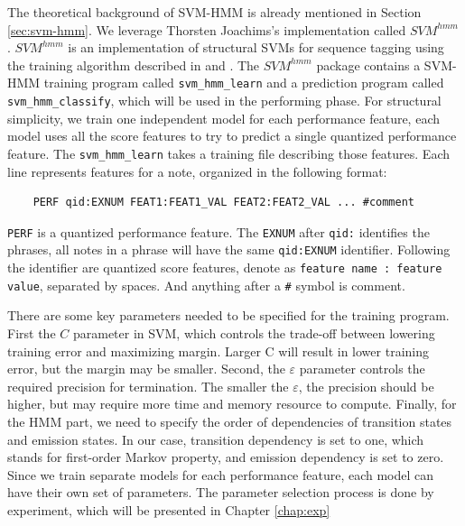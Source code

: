 The theoretical background of SVM-HMM is already mentioned in Section \ref{sec:svm-hmm}. We leverage Thorsten Joachims's implementation called $SVM^{hmm}$ \cite{Joachims2008}. $SVM^{hmm}$ is an implementation of structural SVMs for sequence tagging \cite{svm2003} using the training algorithm described in \cite{svm2005} and \cite{svm2009}. The $SVM^{hmm}$ package contains a SVM-HMM training program called \texttt{svm\_hmm\_learn} and a prediction program called \texttt{svm\_hmm\_classify}, which will be used in the performing phase. For structural simplicity, we train one independent model for each performance feature, each model uses all the score features to try to predict a single quantized performance feature. The \texttt{svm\_hmm\_learn} takes a training file describing those features. Each line represents features for a note, organized in the following format:
\begin{lstlisting}
	PERF qid:EXNUM FEAT1:FEAT1_VAL FEAT2:FEAT2_VAL ... #comment
\end{lstlisting}
\texttt{PERF} is a quantized performance feature. The \texttt{EXNUM} after \texttt{qid:} identifies the phrases, all notes in a phrase will have the same \texttt{qid:EXNUM} identifier. Following the identifier are quantized score features, denote as \texttt{feature name : feature value}, separated by spaces. And anything after a \texttt{\#} symbol is comment. %



There are some key parameters needed to be specified for the training program. First the $C$ parameter in SVM, which controls the trade-off between lowering training error and maximizing margin. Larger C will result in lower training error, but the margin may be smaller. Second, the $\varepsilon$ parameter controls the required precision for termination. The smaller the $\varepsilon$, the precision should be higher, but may require more time and memory resource to compute. Finally, for the HMM part, we need to specify the order of dependencies of transition states and emission states. In our case, transition dependency is set to one, which stands for first-order Markov property, and emission dependency is set to zero. Since we train separate models for each performance feature, each model can have their own set of parameters. The parameter selection process is done by experiment, which will be presented in Chapter \ref{chap:exp}

